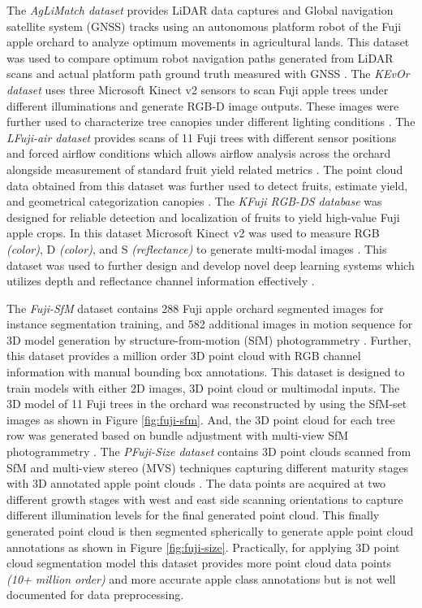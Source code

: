 \documentclass{article}
\begin{document}
The \textit{AgLiMatch dataset} provides LiDAR data captures and Global navigation satellite system (GNSS) tracks using an autonomous platform robot of the Fuji apple orchard to analyze optimum movements in agricultural lands.
This dataset was used to compare optimum robot navigation paths generated from LiDAR scans and actual platform path ground truth measured with GNSS \cite{guevara2021comparison}.
The \textit{KEvOr dataset} uses three Microsoft Kinect v2 sensors to scan Fuji apple trees under different illuminations and generate RGB-D image outputs. These images were further used to characterize tree canopies under different lighting conditions \cite{gene2020assessing}.
The \textit{LFuji-air dataset} provides scans of 11 Fuji trees with different sensor positions and forced airflow conditions which allows airflow analysis across the orchard alongside measurement of standard fruit yield related metrics \cite{gene2020lfuji}.
The point cloud data obtained from this dataset was further used to detect fruits, estimate yield, and geometrical categorization canopies \cite{gene2020fruit}.
The \textit{KFuji RGB-DS database} was designed for reliable detection and localization of fruits to yield high-value Fuji apple crops.
In this dataset Microsoft Kinect v2 was used to measure RGB \textit{(color)},  D \textit{(color)}, and S \textit{(reflectance)} to generate multi-modal images \cite{gene2019kfuji}.
This dataset was used to further design and develop novel deep learning systems which utilizes depth and reflectance channel information effectively \cite{gene2019multi}.


The \textit{Fuji-SfM} dataset contains 288 Fuji apple orchard segmented images for instance segmentation training, and 582 additional images in motion sequence for 3D model generation by structure-from-motion (SfM) photogrammetry \cite{gene2020fuji}.
Further, this dataset provides a million order 3D point cloud with RGB channel information with manual bounding box annotations.
This dataset is designed to train models with either 2D images, 3D point cloud or multimodal inputs. 
The 3D model of 11 Fuji trees in the orchard was reconstructed by using the  SfM-set images as shown in Figure \ref{fig:fuji-sfm}.
And, the 3D point cloud for each tree row was generated based on bundle adjustment with multi-view SfM photogrammetry \cite{triggs2000bundle}.
The \textit{PFuji-Size dataset} contains 3D point clouds scanned from SfM and multi-view stereo (MVS) techniques capturing different maturity stages with 3D annotated apple point clouds \cite{gene2021pfuji}.
The data points are acquired at two different growth stages with west and east side scanning orientations to capture different illumination levels for the final generated point cloud.
This finally generated point cloud is then segmented spherically to generate apple point cloud annotations as shown in Figure \ref{fig:fuji-size}.
Practically, for applying 3D point cloud segmentation model this dataset provides more point cloud data points \textit{(10+ million order)} and more accurate apple class annotations but is not well documented for data preprocessing.
\end{document}
